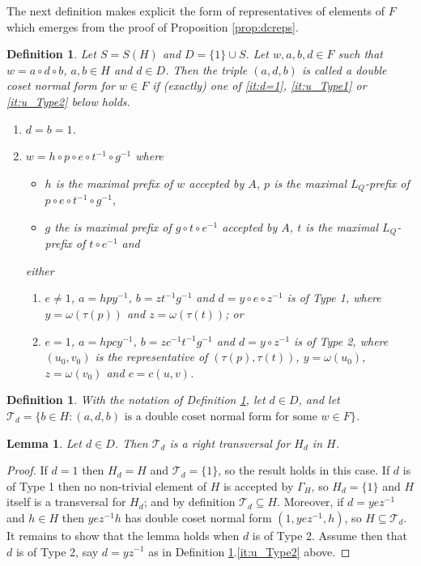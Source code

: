\documentclass[a4paper,12pt]{article}
\newcommand{\G}{\Gamma }
\renewcommand{\t}{\tau }
\newcommand{\w}{\omega }
\newtheorem{lemma}[theorem]{Lemma}
\newtheorem{definition}[theorem]{Definition}
\numberwithin{equation}{section}
\numberwithin{figure}{section}
\newcommand{\cT}{\mathcal{T}}
\newcommand{\be}{\begin{enumerate}}
\newcommand{\ee}{\end{enumerate}}
\newcommand{\biz}{\begin{itemize}}
\newcommand{\eiz}{\end{itemize}}
\begin{document}
{The next definition makes explicit the form of representatives of elements of
$F$ which emerges from the proof of Proposition \ref{prop:dcreps}.
\begin{definition}\label{def:free_dc_nf}
Let $S=S(H)$ and $D=\{1\}\cup S$. Let $w,a,b,d\in F$ such that $w=a\circ d\circ b$, 
$a,b\in H$ and $d\in D$. Then the triple $(a,d,b)$ is called a \emph{double coset normal form for}
$w\in F$ if (exactly) one of \ref{it:d=1}, \ref{it:u_Type1} or  \ref{it:u_Type2}  below holds.
\be
\item\label{it:d=1} $d=b=1$.
\item\label{it:d!=1} $w=h\circ p\circ e\circ t^{-1}\circ g^{-1}$ where
\biz  
\item $h$ is the maximal prefix of $w$ accepted by $A$, $p$ is the maximal $L_Q$-prefix of $p\circ e\circ t^{-1}\circ g^{-1}$,
\item  $g$ the is maximal prefix of $g\circ t\circ e^{-1}$ accepted by $A$, $t$ is the maximal $L_Q$-prefix of $t\circ e^{-1}$
 and 
\eiz 
either  
\be
\item \label{it:u_Type1}  $e\neq 1$, $a=hpy^{-1}$, $b=zt^{-1}g^{-1}$ and  $d=y\circ e \circ z^{-1}$ is of Type 1, where  
 $y=\w(\t(p))$ and 
 $z=\w(\t(t))$; 
or 
\item\label{it:u_Type2}    $e= 1$,  $a=hpcy^{-1}$, $b=zc^{-1}t^{-1}g^{-1}$ and  $d=y\circ z^{-1}$ is of Type 2, where 
$(u_0,v_0)$ is the representative of $(\t(p),\t(t))$, $y=\w(u_0)$, 
 $z=\w(v_0)$ and $c=c(u,v)$.
\ee
\ee  
\end{definition} 
\begin{definition}\label{def:dc_trans}
With the notation of Definition \ref{def:free_dc_nf}, let $d\in D$, 
and let 
$\cT_d=\{b\in H:(a,d,b)\textrm{ is a  double
coset normal form for some } w\in F\}$.
\end{definition} 
\begin{lemma}\label{lem:dc_trans}
Let $d\in D$. Then $\cT_d$ is a right transversal for $H_d$ in $H$. 
\end{lemma}
\begin{proof}
If $d=1$ then $H_d=H$ and $\cT_d=\{1\}$, so the result holds in this case. If $d$ is of Type 1 then no non-trivial element
of $H$ is accepted by $\G_H$, so $H_d=\{1\}$ and $H$ itself is a transversal for $H_d$; and by definition  $\cT_d\subseteq H$. 
Moreover, if $d=yez^{-1}$ and $h\in H$ then $yez^{-1}h$ has double coset normal form $(1,yez^{-1},h)$, so $H\subseteq \cT_d$.
It remains to show that the lemma holds when $d$ is of Type 2. 
Assume then that $d$ is of Type 2, say $d=yz^{-1}$ as in Definition \ref{def:free_dc_nf}.\ref{it:u_Type2} above. 



\end{proof}}
\end{document}
